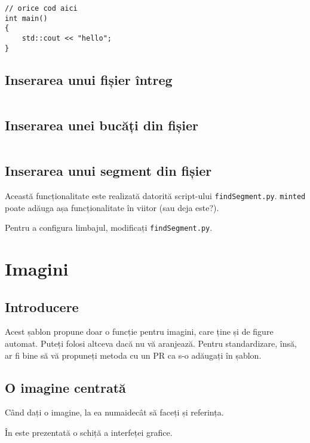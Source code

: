 \documentclass[a4paper,12pt]{report}
\begin{document}
\begin{verbatim}
// orice cod aici
int main()
{
    std::cout << "hello";
}
\end{verbatim}

\subsection{Inserarea unui fișier întreg}

\inputminted[]{zig}{../src/sourcefile.zig}

\subsection{Inserarea unei bucăți din fișier}

\inputminted[firstline=2,lastline=5]{zig}{../src/sourcefile.zig}

\subsection{Inserarea unui segment din fișier}

Această funcționalitate este realizată datorită script-ului \texttt{findSegment.py}.
\texttt{minted} poate adăuga așa funcționalitate în viitor (sau deja este?).

Pentru a configura limbajul, modificați \texttt{findSegment.py}.


\section{Imagini}

\subsection{Introducere}

Acest șablon propune doar o funcție pentru imagini, care ține și de figure automat.
Puteți folosi altceva dacă nu vă aranjează.
Pentru standardizare, însă, ar fi bine să vă propuneți metoda cu un \ac{PR} ca s-o adăugați în șablon.

\subsection{O imagine centrată}

Când dați o imagine, la ea numaidecât să faceți și referința.

În  este prezentată o schiță a interfeței grafice.
\end{document}

